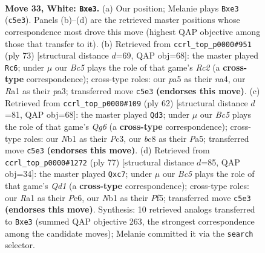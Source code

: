 \documentclass[11pt]{article}
\begin{document}
\clearpage

\begin{figure}[p]\centering
\begin{subfigure}{0.46\textwidth}\centering
\resizebox{\linewidth}{!}{%
\newchessgame
\chessboard[
  setfen={rnb1k3/8/5R2/p1Bp4/1p6/4q3/PPP3P1/RN4K1 w - - 0 33},
  showmover=false,
  pgfstyle=straightmove, color=movearrow, markmove={c5-e3}
]}
\caption{}
\end{subfigure}\hfill
\begin{subfigure}{0.46\textwidth}\centering
\resizebox{\linewidth}{!}{%
\newchessgame
\chessboard[
  setfen={8/1kr5/p5p1/3Q4/N2b1PPp/P3p2P/3P3K/5r2 b - - 7 37},
  showmover=false,
  pgfstyle=straightmove, color=movearrow, markmove={c7-c6}
]}
\caption{}
\end{subfigure}
\\[4pt]
\begin{subfigure}{0.46\textwidth}\centering
\resizebox{\linewidth}{!}{%
\newchessgame
\chessboard[
  setfen={5r1k/p7/5pQ1/Pp2p3/2q5/2P3P1/4KP2/R7 w - - 1 32},
  showmover=false,
  pgfstyle=straightmove, color=movearrow, markmove={g6-d3}
]}
\caption{}
\end{subfigure}\hfill
\begin{subfigure}{0.46\textwidth}\centering
\resizebox{\linewidth}{!}{%
\newchessgame
\chessboard[
  setfen={3q4/ppQ4k/4p2p/5pnB/1P1P4/P3r3/2R3P1/6K1 b - - 1 39},
  showmover=false,
  pgfstyle=straightmove, color=movearrow, markmove={d8-c7}
]}
\caption{}
\end{subfigure}
\caption{\textbf{Move 33, White: \texttt{Bxe3}.} (a) Our position; Melanie plays \texttt{Bxe3} (\texttt{c5e3}). Panels (b)--(d) are the retrieved master positions whose correspondence most drove this move (highest QAP objective among those that transfer to it). (b) Retrieved from \texttt{ccrl\_top\_p0000\#951} (ply 73) [structural distance $d$=69, QAP obj=68]: the master played \texttt{Rc6}; under $\mu$ our \emph{Bc5} plays the role of that game's \emph{Rc2} (a \textbf{cross-type} correspondence); cross-type roles: our \emph{p}a5 as their \emph{n}a4, our \emph{R}a1 as their \emph{p}a3; transferred move \texttt{c5e3} \textbf{(endorses this move)}. (c) Retrieved from \texttt{ccrl\_top\_p0000\#109} (ply 62) [structural distance $d$=81, QAP obj=68]: the master played \texttt{Qd3}; under $\mu$ our \emph{Bc5} plays the role of that game's \emph{Qg6} (a \textbf{cross-type} correspondence); cross-type roles: our \emph{N}b1 as their \emph{P}c3, our \emph{b}c8 as their \emph{P}a5; transferred move \texttt{c5e3} \textbf{(endorses this move)}. (d) Retrieved from \texttt{ccrl\_top\_p0000\#1272} (ply 77) [structural distance $d$=85, QAP obj=34]: the master played \texttt{Qxc7}; under $\mu$ our \emph{Bc5} plays the role of that game's \emph{Qd1} (a \textbf{cross-type} correspondence); cross-type roles: our \emph{R}a1 as their \emph{P}e6, our \emph{N}b1 as their \emph{P}f5; transferred move \texttt{c5e3} \textbf{(endorses this move)}. Synthesis: 10 retrieved analogs transferred to \texttt{Bxe3} (summed QAP objective 263, the strongest correspondence among the candidate moves); Melanie committed it via the \texttt{search} selector.}
\label{fig:thought-m64}
\end{figure}
\end{document}
